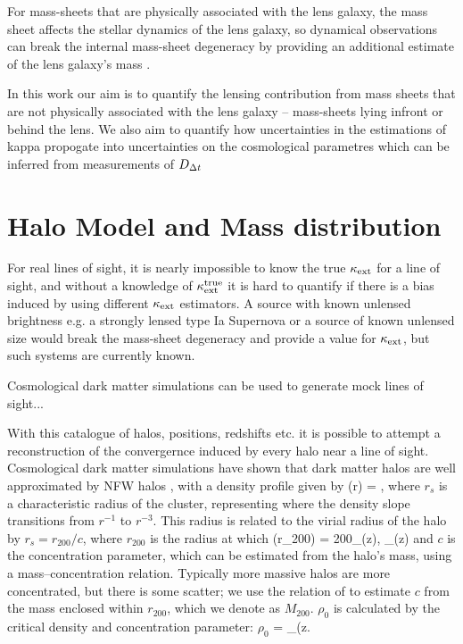 \documentclass[useAMS,usenatbib]{mn2e}
\begin{document}
For mass-sheets that are physically associated with the lens galaxy, the mass sheet
 affects the stellar dynamics of the
lens galaxy, so dynamical observations can break the internal
mass-sheet degeneracy by providing an additional estimate of the lens galaxy's mass
\citep[e.g.,][]{GroginNarayan96a, GroginNarayan96b, TonryFranx99, KoopmansTreu02,
 TreuKoopmans02, BarnabeKoopmans07, suyu2010}. 

In this work our aim is to quantify the lensing contribution from mass sheets that
are not physically associated with the lens galaxy -- mass-sheets lying infront or behind
the lens. We also aim to quantify how uncertainties in the estimations of kappa
propogate into uncertainties on the cosmological parametres which can be inferred
from measurements of $D_{\Delta t}$



\section{Halo Model and Mass distribution}
\label{sec:model}

For real lines of sight, it is nearly impossible to know the true $\kappa_{\rm ext}$ for a
line of sight, and without a knowledge of $\kappa_{\rm ext}^{\mathrm{true}}$ it is hard to
quantify if there is a bias induced by using different $\kappa_{\rm ext}$ estimators.
A source with known unlensed brightness e.g. a strongly lensed type Ia
Supernova  or a source of known unlensed size 
would break the mass-sheet degeneracy and provide a value for $\kappa_{\rm ext}$, but
 such systems are currently known.

Cosmological dark matter simulations can be used to generate mock lines of sight...

With this catalogue of halos, positions, redshifts etc. it is possible to attempt
a reconstruction of the convergernce induced by every halo near a line of sight.
Cosmological dark matter simulations have shown that dark matter halos are well
approximated by NFW halos \citep{NFW1997}, with a density profile given by
\be\label{eq:rhonfw}
\rho(r) = 
,
\ee
where $r_{s}$ is a characteristic radius of the cluster, representing where
the density slope transitions from $r^{-1}$ to $r^{-3}$. This radius is related
to the virial radius of the halo by $r_{s} = r_{200}/c$, where $r_{200}$ is the radius at 
which 
\be
\rho(r_{200}) = 200\rho_{{}}(z),  \rho_{}(z) \equiv {}
\ee
 and $c$ is the concentration parameter, which can be estimated from the halo's mass,
using a mass--concentration relation. Typically more massive halos are more concentrated,
but there is some scatter; we use the relation of \citet{neto2007} to estimate $c$
from the mass enclosed within $r_{200}$, which we denote as $M_{200}$. $\rho_0$ is calculated 
by the critical density and concentration parameter:
\be
$\rho_0$ = \rho_{}(z.
\ee
\end{document}

